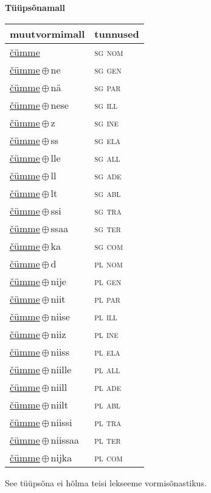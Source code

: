 

\vspace{3.5em}
\noindent \begin{minipage}{\textwidth}
\noindent \textbf{Tüüpsõnamall \,}\\

\begin{sideways}
\begin{tabular}{l l}
muutvormimall & tunnused \\
\hline
\underline{čümme} & \textsc{ sg nom } \\
\underline{čümme}\,$\oplus$\,ne & \textsc{ sg gen } \\
\underline{čümme}\,$\oplus$\,nä & \textsc{ sg par } \\
\underline{čümme}\,$\oplus$\,nese & \textsc{ sg ill } \\
\underline{čümme}\,$\oplus$\,z & \textsc{ sg ine } \\
\underline{čümme}\,$\oplus$\,ss & \textsc{ sg ela } \\
\underline{čümme}\,$\oplus$\,lle & \textsc{ sg all } \\
\underline{čümme}\,$\oplus$\,ll & \textsc{ sg ade } \\
\underline{čümme}\,$\oplus$\,lt & \textsc{ sg abl } \\
\underline{čümme}\,$\oplus$\,ssi & \textsc{ sg tra } \\
\underline{čümme}\,$\oplus$\,ssaa & \textsc{ sg ter } \\
\underline{čümme}\,$\oplus$\,ka & \textsc{ sg com } \\
\underline{čümme}\,$\oplus$\,d & \textsc{ pl nom } \\
\underline{čümme}\,$\oplus$\,nije & \textsc{ pl gen } \\
\underline{čümme}\,$\oplus$\,niit & \textsc{ pl par } \\
\underline{čümme}\,$\oplus$\,niise & \textsc{ pl ill } \\
\underline{čümme}\,$\oplus$\,niiz & \textsc{ pl ine } \\
\underline{čümme}\,$\oplus$\,niiss & \textsc{ pl ela } \\
\underline{čümme}\,$\oplus$\,niille & \textsc{ pl all } \\
\underline{čümme}\,$\oplus$\,niill & \textsc{ pl ade } \\
\underline{čümme}\,$\oplus$\,niilt & \textsc{ pl abl } \\
\underline{čümme}\,$\oplus$\,niissi & \textsc{ pl tra } \\
\underline{čümme}\,$\oplus$\,niissaa & \textsc{ pl ter } \\
\underline{čümme}\,$\oplus$\,nijka & \textsc{ pl com } \\
\end{tabular}
\end{sideways}
\label{tab:tüüpsõnamall-čümme}

\end{minipage}

 
\vspace{1em}
\noindent See tüüpsõna ei hõlma teisi lekseeme vormi\-sõnastikus.
